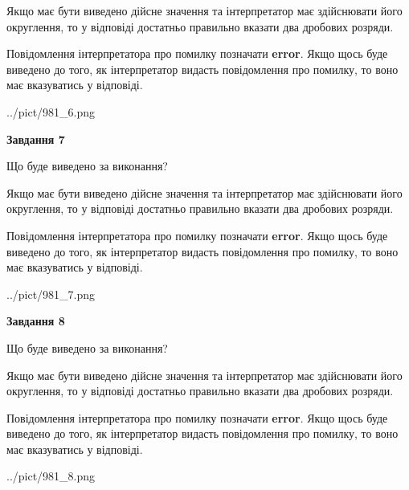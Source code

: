 \documentclass[12pt, ukrainian]{article}
\begin{document}
{\begin {Large}
Якщо має бути виведено дійсне значення та інтерпретатор має здійснювати його округлення, 
то у відповіді достатньо правильно вказати два дробових розряди.

Повідомлення інтерпретатора про помилку позначати \textbf{error}.
Якщо щось буде виведено до того, як інтерпретатор видасть повідомлення про помилку, 
то воно має вказуватись у відповіді. \par

\begin{center}
	{../pict/981_6.png}
\end{center}
\newpage

{\begin {center}\textbf{Завдання 7}\end {center}}\par
Що буде виведено за виконання? \par

Якщо має бути виведено дійсне значення та інтерпретатор має здійснювати його округлення, 
то у відповіді достатньо правильно вказати два дробових розряди.

Повідомлення інтерпретатора про помилку позначати \textbf{error}.
Якщо щось буде виведено до того, як інтерпретатор видасть повідомлення про помилку, 
то воно має вказуватись у відповіді. \par

\begin{center}
	{../pict/981_7.png}
\end{center}
\newpage

{\begin {center}\textbf{Завдання 8}\end {center}}\par
Що буде виведено за виконання? \par

Якщо має бути виведено дійсне значення та інтерпретатор має здійснювати його округлення, 
то у відповіді достатньо правильно вказати два дробових розряди.

Повідомлення інтерпретатора про помилку позначати \textbf{error}.
Якщо щось буде виведено до того, як інтерпретатор видасть повідомлення про помилку, 
то воно має вказуватись у відповіді. \par

\begin{center}
	{../pict/981_8.png}
\end{center}
\newpage


\end{Large}}
\end{document}
